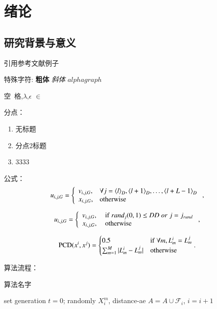 
\chapter{绪论\label{intro}}


\section{研究背景与意义}

引用参考文献例子 \cite{USE} \cite{USE2}

特殊字符:
\textbf{粗体}
\emph{斜体}
$alphagraph$

空~格,$\lambda$,$\epsilon$  $\in$

分点：
\begin{enumerate}
	\item{} 无标题
	\item{分点2标题}
	\item 3333
\end{enumerate}

公式：
\begin{equation}
u_{i,j,G} =\left\{
   \begin{array}{ll}
   v_{i,j,G}, & \forall j = {\langle l \rangle}_{D},{\langle l+1 \rangle}_{D},\ldots,{\langle l+L-1 \rangle}_{D} \\
   x_{i,j,G}, & {\rm otherwise} \
   \end{array}\right.,
\label{EX}
\end{equation}

\begin{equation}
u_{i,j,G} =\left\{
   \begin{array}{ll}
   v_{i,j,G}, &\ {\rm if} \  rand_{j}(0,1) \le DD \; or \; j=j_{rand} \\
   x_{i,j,G}, &\ {\rm otherwise} \
   \end{array}\right.,
\label{DEX}
\end{equation}

\begin{equation}
{\rm PCD}(x^i,x^j)=
\begin{cases}
0.5 & {\rm if}\ \forall m, L_m^i=L_m^j \\
\sum_{m=1}^{M}|L_m^i-L_m^j| & {\rm otherwise} \\
\end{cases}
.
\end{equation}


算法流程：
\begin{algorithm}[t] %
\footnotesize
\caption{算法名字}
\label{algo_CCMODE_CCM}
set generation $t=0$;
{
	{
		randomly  \;
		 $X_{i}^{m}$,
	}
}
{
	{
		distance-ae\;
		$A = A \cup \mathcal{F}_{i}$,
		$i=i+1$\;
	}
}
\end{algorithm}

